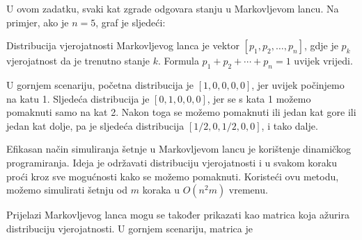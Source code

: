 U ovom zadatku, svaki kat zgrade
odgovara stanju u Markovljevom lancu.
Na primjer, ako je $n=5$, graf je sljedeći:

\begin{center}
\end{center}

Distribucija vjerojatnosti
Markovljevog lanca je vektor
$[p_1,p_2,\ldots,p_n]$, gdje je $p_k$
vjerojatnost da je trenutno stanje $k$.
Formula $p_1+p_2+\cdots+p_n=1$ uvijek vrijedi.

U gornjem scenariju, početna distribucija je
$[1,0,0,0,0]$, jer uvijek počinjemo na katu 1.
Sljedeća distribucija je $[0,1,0,0,0]$,
jer se s kata 1 možemo pomaknuti samo na kat 2.
Nakon toga se možemo pomaknuti ili jedan kat gore
ili jedan kat dolje, pa je sljedeća distribucija
$[1/2,0,1/2,0,0]$, i tako dalje.

Efikasan način simuliranja šetnje u
Markovljevom lancu je korištenje dinamičkog programiranja.
Ideja je održavati distribuciju vjerojatnosti
i u svakom koraku proći kroz sve mogućnosti
kako se možemo pomaknuti.
Koristeći ovu metodu, možemo simulirati
šetnju od $m$ koraka u $O(n^2 m)$ vremenu.

Prijelazi Markovljevog lanca mogu se također
prikazati kao matrica koja ažurira
distribuciju vjerojatnosti.
U gornjem scenariju, matrica je

